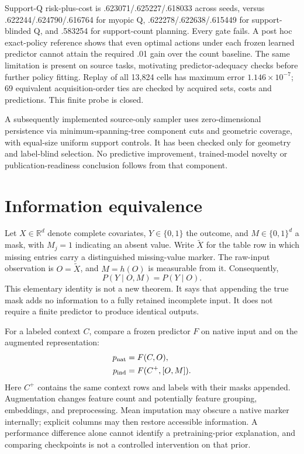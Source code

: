 \documentclass[10pt]{article}
\begin{document}
Support-Q risk-plus-cost is .623071/.625227/.618033 across seeds, versus .622244/.624790/.616764 for myopic Q, .622278/.622638/.615449 for support-blinded Q, and .583254 for support-count planning. Every gate fails. A post hoc exact-policy reference shows that even optimal actions under each frozen learned predictor cannot attain the required .01 gain over the count baseline. The same limitation is present on source tasks, motivating predictor-adequacy checks before further policy fitting. Replay of all 13,824 cells has maximum error $1.146\times10^{-7}$; 69 equivalent acquisition-order ties are checked by acquired sets, costs and predictions. This finite probe is closed.

A subsequently implemented source-only sampler uses zero-dimensional persistence via minimum-spanning-tree component cuts and geometric coverage, with equal-size uniform support controls. It has been checked only for geometry and label-blind selection. No predictive improvement, trained-model novelty or publication-readiness conclusion follows from that component.

\section{Information equivalence}
Let $X\in\mathbb{R}^{d}$ denote complete covariates, $Y\in\{0,1\}$ the outcome, and $M\in\{0,1\}^{d}$ a mask, with $M_j=1$ indicating an absent value. Write $\widetilde X$ for the table row in which missing entries carry a distinguished missing-value marker. The raw-input observation is $O=\widetilde X$, and $M=h(O)$ is measurable from it. Consequently,
\begin{equation}
 P(Y\mid O,M)=P(Y\mid O).
 \label{eq:information}
\end{equation}
This elementary identity is not a new theorem. It says that appending the true mask adds no information to a fully retained incomplete input. It does not require a finite predictor to produce identical outputs.

For a labeled context $C$, compare a frozen predictor $F$ on native input and on the augmented representation:
\begin{align}
 p_{\rm nat} &= F(C,O),\\
 p_{\rm ind} &= F(C^{+},[O,M]).
\end{align}
Here $C^{+}$ contains the same context rows and labels with their masks appended. Augmentation changes feature count and potentially feature grouping, embeddings, and preprocessing. Mean imputation may obscure a native marker internally; explicit columns may then restore accessible information. A performance difference alone cannot identify a pretraining-prior explanation, and comparing checkpoints is not a controlled intervention on that prior.
\end{document}
